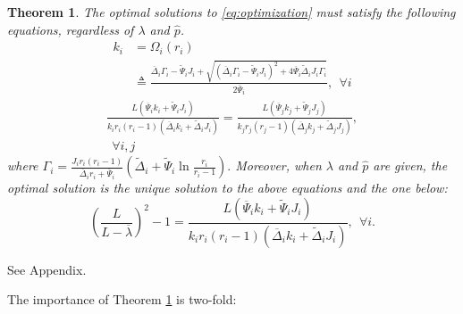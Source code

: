 \documentclass[journal]{IEEEtran}
\newcommand{\compVec}{\hat{p}}
\newcommand{\normArrival}{\overline{\lambda}}
\newcommand{\fixedDelta}{\overline{\Delta}}
\newcommand{\linearDelta}{\widetilde{\Delta}}
\newcommand{\fixedExp}{\overline{\Psi}}
\newcommand{\linearExp}{\widetilde{\Psi}}
\newcommand{\FR}{\Gamma}
\newcommand{\KR}{\Omega}
\newtheorem{theorem}{\textbf{Theorem}}
\begin{document}
\begin{theorem}
\label{thm:optimal}
The optimal solutions to \eqref{eq:optimization} must satisfy the following equations, regardless of $\lambda$ and $\compVec$.
\begin{align}
k_i &= \KR_i(r_i)
\nonumber\\
&\triangleq\frac{\fixedDelta_i \FR_i - \linearExp_i J_i + \sqrt{(\fixedDelta_i \FR_i - \linearExp_i J_i)^2 + 4\fixedExp_i \linearDelta_i J_i \FR_i }}{2\fixedExp_i},
~~\forall i
\label{eq:opt:k-function-r}
\end{align}
\begin{align}
\frac{L (\fixedExp_i k_i + \linearExp_i J_i)}{k_i r_i (r_i-1) (\fixedDelta_i k_i + \linearDelta_i J_i)}
= \frac{L (\fixedExp_j k_j + \linearExp_j J_j)}{k_j r_j (r_j-1) (\fixedDelta_j k_j + \linearDelta_j J_j)},
\nonumber\\
~~\forall i,j
\label{eq:opt:invariant-i}
\end{align}
where
$
\FR_i = \frac{J_i r_i(r_i-1)}{\fixedDelta_i r_i + \fixedExp_i}\left(\linearDelta_i + \linearExp_i\ln\frac{r_i}{r_i-1}\right).
$
Moreover, when $\lambda$ and $\compVec$ are given, the optimal solution is the unique solution to the above equations and the one below:
\begin{equation}
\left(\frac{L}{L-\normArrival}\right)^2-1
= \frac{L (\fixedExp_i k_i + \linearExp_i J_i)}{k_i r_i (r_i-1) (\fixedDelta_i k_i + \linearDelta_i J_i)},~~\forall i.
\label{eq:opt:normArrival}
\end{equation}
\end{theorem}
\begin{IEEEproof} 
See Appendix.\\
\end{IEEEproof}
The importance of Theorem \ref{thm:optimal} is two-fold:
\end{document}
